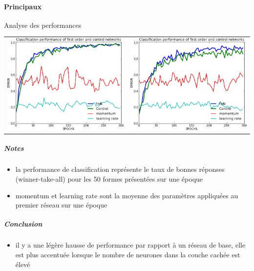     \paragraph{Principaux}
      Analyse des performances
      \begin{center}
	\begin{tabular}{lr}
	  \hspace*{-1cm}
	  \includegraphics[width=250px]{data/expD4/perf.png}
	  &
	  \includegraphics[width=250px]{data/expD4/perf_100.png} 
	\end{tabular}
      \end{center} 
      \subparagraph{Notes}
	\begin{itemize}
	  \item la performance de classification représente le taux de bonnes réponses (winner-take-all) pour les 50 formes présentées sur une époque
	  \item momentum et learning rate sont la moyenne des paramètres appliquées au premier réseau sur une époque
	\end{itemize}
      \subparagraph{Conclusion}
	\begin{itemize}
	  \item il y a une légère hausse de performance par rapport à un réseau de base, elle est plus accentuée lorsque le nombre de neurones dans
	  la couche cachée est élevé
	\end{itemize}
